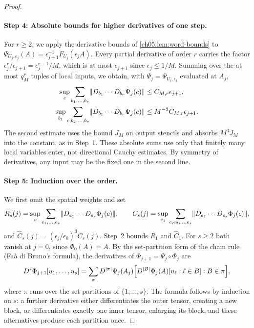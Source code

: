 \begin{proof}
\paragraph{Step 4: Absolute bounds for higher derivatives of one step.}
For $r\ge2$, we apply the derivative bounds of \cref{ch05:lem:word-bounds} to $\Psi_{U_j,\epsilon_j}(A)=\epsilon_{j+1}^{-1}F_{U_j}(\epsilon_jA)$. Every partial derivative of order $r$ carries the factor $\epsilon_j^r/\epsilon_{j+1}=\epsilon_j^{r-1}/M$, which is at most $\epsilon_{j+1}$ since $\epsilon_j\le1/M$. Summing over the at most $q_M^r$ tuples of local inputs, we obtain, with $\Psi_j=\Psi_{U_j,\epsilon_j}$ evaluated at $A_j$,
\begin{equation}\label{ch05:eq:one-step-higher-jets}
 \begin{split}
 \sup_c\sum_{b_1,\ldots,b_r}\lVert D_{b_1}\cdots D_{b_r}\Psi_j(c)\rVert&\le C_{M,r}\epsilon_{j+1},\\
 \sup_{b_1}\sum_{c,b_2,\ldots,b_r}\lVert D_{b_1}\cdots D_{b_r}\Psi_j(c)\rVert&\le M^{-3}C_{M,r}\epsilon_{j+1}.
 \end{split}
\end{equation}
The second estimate uses the bound $J_M$ on output stencils and absorbs $M^3J_M$ into the constant, as in Step~1. These absolute sums use only that finitely many local variables enter, not directional Cauchy estimates. By symmetry of derivatives, any input may be the fixed one in the second line.

\paragraph{Step 5: Induction over the order.}
We first omit the spatial weights and set
\[
 R_s(j)=\sup_c\sum_{e_1,\ldots,e_s}\lVert D_{e_1}\cdots D_{e_s}\Phi_j(c)\rVert,\qquad
 C_s(j)=\sup_{e_1}\sum_{c,e_2,\ldots,e_s}\lVert D_{e_1}\cdots D_{e_s}\Phi_j(c)\rVert,
\]
and $\widehat C_s(j)=(\epsilon_j/\epsilon_0)^3C_s(j)$. Step~2 bounds $R_1$ and $\widehat C_1$. For $s\ge2$ both vanish at $j=0$, since $\Phi_0(A)=A$. By the set-partition form of the chain rule (Faà di Bruno's formula), the derivatives of $\Phi_{j+1}=\Psi_j\circ\Phi_j$ are
\begin{equation}\label{ch05:eq:partition-chain}
 D^s\Phi_{j+1}[u_1,\ldots,u_s]=\sum_\pi D^{\lvert \pi\rvert}\Psi_j(A_j)\Bigl[D^{\lvert B\rvert}\Phi_j(A)[u_\ell:\ell\in B]:B\in\pi\Bigr],
\end{equation}
where $\pi$ runs over the set partitions of $\{1,\ldots,s\}$. The formula follows by induction on $s$: a further derivative either differentiates the outer tensor, creating a new block, or differentiates exactly one inner tensor, enlarging its block, and these alternatives produce each partition once.


\end{proof}
